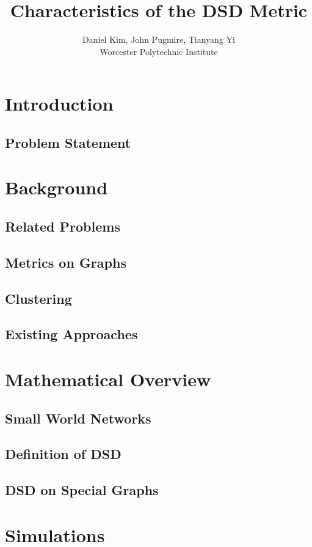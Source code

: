\documentclass[11pt,oneside]{report}
\theoremstyle{definition}
\begin{document}
\title{Characteristics of the DSD Metric}
\author{Daniel Kim, John Pugmire, Tianyang Yi\\Worcester Polytechnic Institute\\}
\maketitle
\tableofcontents


\chapter{Introduction}

\section{Problem Statement}

\chapter{Background}

\section{Related Problems}

\section{Metrics on Graphs}

\section{Clustering}

\section{Existing Approaches}


\chapter{Mathematical Overview}
\section{Small World Networks}


\section{Definition of DSD}


\section{DSD on Special Graphs}


\chapter{Simulations}

\end{document}
